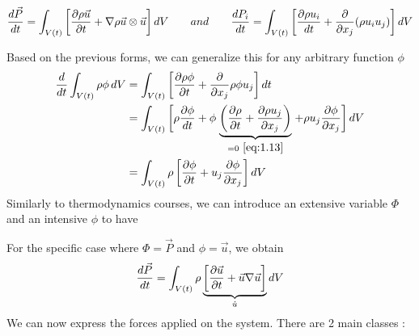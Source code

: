 	\begin{center}
	\begin{equation}
		\frac{d\vec{P}}{dt} = \int _{V(t)} \left[\frac{\D \rho \vec{u}}{\D t} + \nabla \rho \vec{u} \otimes \vec{u} \right] dV \qquad and \qquad \frac{dP_i}{dt} = \int _{V(t)} \left[ \frac{\D \rho u_i}{dt} + \frac{\D}{\D x_j} (\rho u_i u_j) \right] dV
	\end{equation}
	\end{center}
	
	Based on the previous forms, we can generalize this for any arbitrary function $\phi$
	\begin{equation}
	\begin{aligned}
		\frac{d}{dt} \int _{V(t)} \rho \phi\, dV  &= \int _{V(t)} \left[\frac{\D \rho \phi}{\D t} + \frac{\D}{\D x_j} \rho \phi u_j \right] dt \\
		&= \int _{V(t)} \left[ \rho \frac{\D \phi}{dt} + \phi \right. \underbrace{\left( \frac{\D \rho}{\D t} + \frac{\D \rho u_j}{\D x_j} \right)}_{= 0\ \autoref{eq:1.13}}\left. + \rho u_j\frac{\D \phi}{\D x_j} \right] dV \\
		&= \int _{V(t)} \rho \left[ \frac{\D \phi}{\D t} + u_j \frac{\D \phi}{\D x_j} \right] dV
	\end{aligned}
	\end{equation}
	Similarly to thermodynamics courses, we can introduce an extensive variable $\Phi$ and an intensive $\phi$ to have 
	\begin{center}
	\end{center}
	For the specific case where $\Phi = \vec{P}$ and $\phi = \vec{u}$, we obtain
	\begin{equation}
		\frac{d\vec{P}}{dt} = \int _{V(t)} \rho \underbrace{\left[ \frac{\D \vec{u}}{\D t} + \vec{u} \nabla \vec{u} \right]}_{\dot{u}} dV 
		\label{eq:1.24}
	\end{equation}
	We can now express the forces applied on the system. There are 2 main classes : \\
